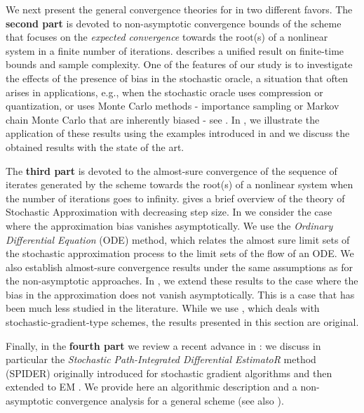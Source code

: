 \documentclass[10pt,twocolumn,twoside]{IEEEtran}
\begin{document}
We next present the general convergence theories for {\SA} in two different favors. 
The \textbf{second part} is devoted to non-asymptotic convergence bounds of the {\SA} scheme that focuses on the \emph{expected convergence} towards the root(s) of a nonlinear system in a finite number of iterations.  describes a unified result on finite-time bounds and sample complexity. One of the features of our study is to investigate the effects of the presence of bias in the stochastic oracle, a situation that often arises in applications, e.g., when the stochastic oracle uses compression or quantization, or uses Monte Carlo methods - importance sampling or Markov chain Monte Carlo that are inherently biased - see \cite{fort:etal:2016,karimi2019non,fort:moulines:2022}. In , we illustrate the application of these results using the examples introduced in  and we discuss the  obtained  results with the state of the art.

The \textbf{third part} is devoted to the almost-sure convergence of the sequence of iterates generated by the {\SA} scheme towards the root(s) of a nonlinear system when the number of iterations goes to infinity.  gives a brief overview of the theory of Stochastic Approximation with decreasing step size.
In  we consider the case where the approximation bias vanishes asymptotically. We use the \emph{Ordinary Differential Equation} (ODE) method, which relates the almost sure limit sets of the stochastic approximation process to the limit sets of the flow of an ODE. 
We also establish almost-sure convergence results under the same assumptions as for the non-asymptotic approaches.
In , we extend these results to the case where the bias in the approximation does not vanish asymptotically. This is a case that has been much less studied in the literature. While we use \cite{tadic2017asymptotic,ramaswamy2017analysis}, which deals with stochastic-gradient-type {\SA} schemes, the results presented in this section are original.

Finally, in the \textbf{fourth part} we review a recent advance in {\SA}: we discuss in particular  the \emph{Stochastic Path-Integrated Differential EstimatoR} method (SPIDER) originally introduced for stochastic gradient algorithms \cite{fang2018spider,wang:etal:2019} and then extended to EM \cite{fort2020stochastic,dieuleveut2021federated}.  We provide here an algorithmic description and a non-asymptotic convergence analysis for a general {\SA} scheme (see also \cite{fort:moulines:2022}).
\end{document}
